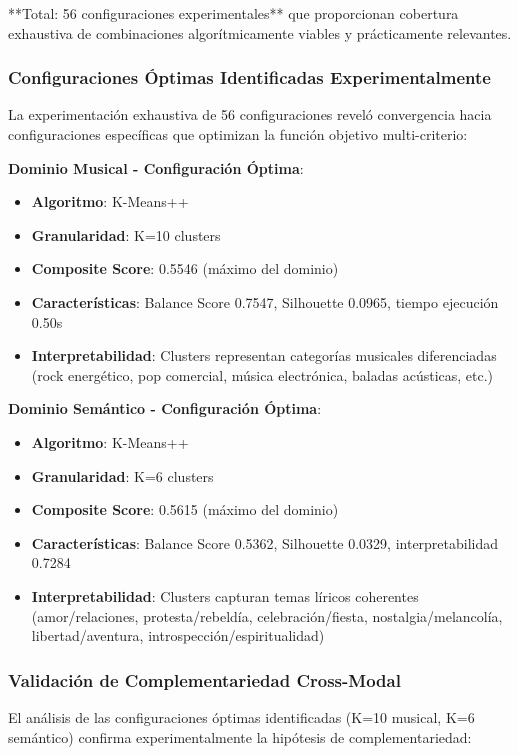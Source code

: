 \documentclass[12pt,a4paper]{report}
\begin{document}
**Total: 56 configuraciones experimentales** que proporcionan cobertura exhaustiva de combinaciones algorítmicamente viables y prácticamente relevantes.

\subsubsection{Configuraciones Óptimas Identificadas Experimentalmente}

La experimentación exhaustiva de 56 configuraciones reveló convergencia hacia configuraciones específicas que optimizan la función objetivo multi-criterio:

\textbf{Dominio Musical - Configuración Óptima}:
\begin{itemize}
\item \textbf{Algoritmo}: K-Means++
\item \textbf{Granularidad}: K=10 clusters
\item \textbf{Composite Score}: 0.5546 (máximo del dominio)
\item \textbf{Características}: Balance Score 0.7547, Silhouette 0.0965, tiempo ejecución 0.50s
\item \textbf{Interpretabilidad}: Clusters representan categorías musicales diferenciadas (rock energético, pop comercial, música electrónica, baladas acústicas, etc.)
\end{itemize}

\textbf{Dominio Semántico - Configuración Óptima}:
\begin{itemize}
\item \textbf{Algoritmo}: K-Means++
\item \textbf{Granularidad}: K=6 clusters
\item \textbf{Composite Score}: 0.5615 (máximo del dominio)
\item \textbf{Características}: Balance Score 0.5362, Silhouette 0.0329, interpretabilidad 0.7284
\item \textbf{Interpretabilidad}: Clusters capturan temas líricos coherentes (amor/relaciones, protesta/rebeldía, celebración/fiesta, nostalgia/melancolía, libertad/aventura, introspección/espiritualidad)
\end{itemize}

\subsubsection{Validación de Complementariedad Cross-Modal}

El análisis de las configuraciones óptimas identificadas (K=10 musical, K=6 semántico) confirma experimentalmente la hipótesis de complementariedad:
\end{document}
